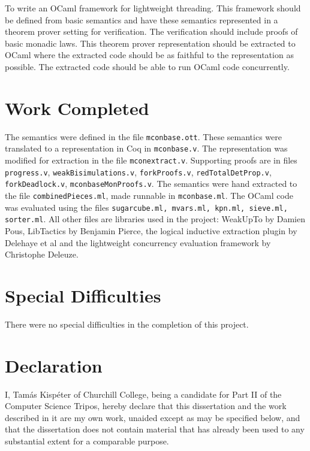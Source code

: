 \documentclass[12pt,twoside,notitlepage]{report}
\theoremstyle{plain}%
\theoremstyle{definition}
\theoremstyle{remark}
\begin{document}
To write an OCaml framework for lightweight threading. This framework should be defined from basic semantics and have these semantics represented in a theorem prover setting for verification. The verification should include proofs of basic monadic laws. This theorem prover representation should be extracted to OCaml where the extracted code should be as faithful to the representation as possible. The extracted code should be able to run OCaml code concurrently.



\section*{Work Completed}

The semantics were defined in the file \verb|mconbase.ott|. These semantics were translated to a representation in Coq in \verb|mconbase.v|. The representation was modified for extraction in the file \verb|mconextract.v|. Supporting proofs are in files \verb|progress.v|, \verb|weakBisimulations.v|, \verb|forkProofs.v|, \verb|redTotalDetProp.v|, \verb|forkDeadlock.v|, \verb|mconbaseMonProofs.v|. The semantics were hand extracted to the file \verb|combinedPieces.ml|, made runnable in \verb|mconbase.ml|. The OCaml code was evaluated using the files \verb|sugarcube.ml, mvars.ml, kpn.ml, sieve.ml, sorter.ml|. All other files are libraries used in the project: WeakUpTo by Damien Pous, LibTactics by Benjamin Pierce, the logical inductive extraction plugin by Delehaye et al and the lightweight concurrency evaluation framework by Christophe Deleuze. 

\section*{Special Difficulties}

There were no special difficulties in the completion of this project.
 
\newpage
\section*{Declaration}

I, Tam\'as Kisp\'eter of Churchill College, being a candidate for Part II of the Computer
Science Tripos, hereby declare
that this dissertation and the work described in it are my own work,
unaided except as may be specified below, and that the dissertation
does not contain material that has already been used to any substantial
extent for a comparable purpose.
\end{document}
